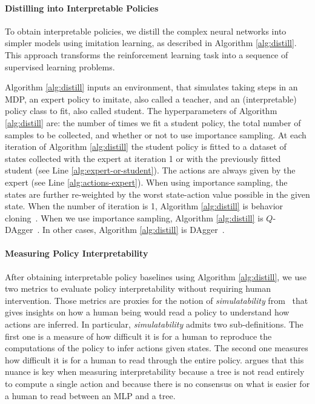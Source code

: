 \paragraph{Distilling into Interpretable Policies}
To obtain interpretable policies, we distill the complex neural networks into simpler models using imitation learning, as described in Algorithm \ref{alg:distill}. This approach transforms the reinforcement learning task into a sequence of supervised learning problems.


Algorithm \ref{alg:distill} inputs an environment, that simulates taking steps in an MDP, an expert policy to imitate, also called a teacher, and an (interpretable) policy class to fit, also called student. The hyperparameters of Algorithm \ref{alg:distill} are: the number of times we fit a student policy, the total number of samples to be collected, and whether or not to use importance sampling. At each iteration of Algorithm \ref{alg:distill} the student policy is fitted to a dataset of states collected with the expert at iteration 1 or with the previously fitted student (see Line \ref{alg:expert-or-student}). The actions are always given by the expert (see Line \ref{alg:actions-expert}). When using importance sampling, the states are further re-weighted by the worst state-action value possible in the given state. When the number of iteration is 1, Algorithm \ref{alg:distill} is behavior cloning~\cite{behavior-cloning}. When we use importance sampling, Algorithm \ref{alg:distill} is $Q$-DAgger~\cite{viper}. In other cases, Algorithm \ref{alg:distill} is DAgger~\cite{dagger}.

\paragraph{Measuring Policy Interpretability}
After obtaining interpretable policy baselines using Algorithm \ref{alg:distill}, we use two metrics to evaluate policy interpretability without requiring human intervention. Those metrics are proxies for the notion of \textit{simulatability} from~\cite{mythos} that gives insights on how a human being would read a policy to understand how actions are inferred. In particular, \textit{simulatability} admits two sub-definitions. The first one is a measure of how difficult it is for a human to reproduce the computations of the policy to infer actions given states. The second one measures how difficult it is for a human to read through the entire policy. \cite{mythos} argues that this nuance is key when measuring interpretability because a tree is not read entirely to compute a single action and because there is no consensus on what is easier for a human to read between an MLP and a tree. 

